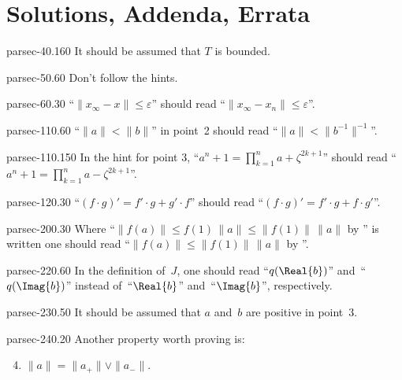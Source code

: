 \documentclass[b5page]{book}
\begin{document}
\appendix
\chapter{Solutions, Addenda, Errata}
\begin{erratum}{parsec-40.160}%
    It should be assumed that $T$ is bounded.
\end{erratum}
\begin{erratum}{parsec-50.60}%
Don't follow the hints.
\end{erratum}
\begin{erratum}{parsec-60.30}%
    ``$\|x_\infty-x\|\leq \varepsilon$'' should read  ``$\|x_\infty-x_n\|\leq\varepsilon$''.
\end{erratum}
\begin{erratum}{parsec-110.60}
``$\|a\| < \|b\|$'' in point~2
    should read ``$\|a\|<  \|b^{-1}\|^{-1}$''.
\end{erratum}
\begin{erratum}{parsec-110.150}
In the hint for point 3,
``$a^n+1 = \prod_{k=1}^n a+\zeta^{2k+1}$''
should read
``$a^n+1 = \prod_{k=1}^n a-\zeta^{2k+1}$''.
\end{erratum}
\begin{erratum}{parsec-120.30}
``$(f\cdot g)'=f'\cdot g + g'\cdot f$'' should
    read ``$(f\cdot g)' = f'\cdot g + f\cdot g'$''.
\end{erratum}
\begin{erratum}{parsec-200.30}
Where  ``$\|f(a)\|\leq f(1)\,\|a\|\leq\|f(1)\|\,\|a\|$
    by ''
is written
one should read
``$\|f(a)\|\leq\|f(1)\|\,\|a\|$ by ''.
\end{erratum}
\begin{erratum}{parsec-220.60}
In the definition of~$J$,
one should read ``$q(\Real{b})$''
and~``$q(\Imag{b})$''
instead of~``$\Real{b}$''
and~``$\Imag{b}$'', respectively.
\end{erratum}
\begin{erratum}{parsec-230.50}
It should be assumed that $a$ and~$b$ are
positive in point~3.
\end{erratum}
\begin{addendum}{parsec-240.20}
Another property worth proving is:
\begin{enumerate}
\setcounter{enumi}{3}
\item
$\|a\|=\|a_+\|\vee \|a_-\|$.
\end{enumerate}
\end{addendum}
\end{document}
